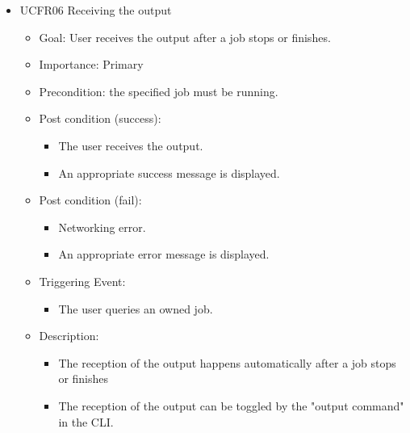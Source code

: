 \begin{itemize}
    \item UCFR06 Receiving the output
    \begin{itemize}
      \item Goal: User receives the output after a job stops or finishes.
      \item Importance: Primary
      \item Precondition: the specified job must be running.
      \item Post condition (success): 
      \begin{itemize}
        \item The user receives the output.
        \item An appropriate success message is displayed.
      \end{itemize}  
      \item Post condition (fail):
      \begin{itemize}
        \item Networking error.
        \item An appropriate error message is displayed.
      \end{itemize}
      \item Triggering Event:
      \begin{itemize}
        \item The user queries an owned job.
      \end{itemize}
      \item Description:
      \begin{itemize}
        \item The reception of the output happens automatically after a job stops or finishes
        \item The reception of the output can be toggled by the "output command" in the CLI.
      \end{itemize}
    \end{itemize}



\end{itemize}
